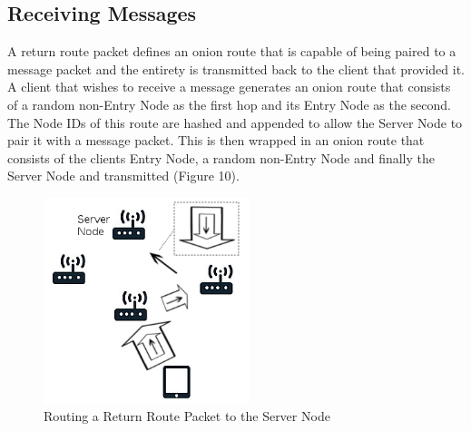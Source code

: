 \documentclass{article}
\begin{document}
\subsection{Receiving Messages}
A return route packet defines an onion route that is capable of being paired to a message packet and the entirety is transmitted back to the client that provided it.
A client that wishes to receive a message generates an onion route that consists of a random non-Entry Node as the first hop and its Entry Node as the second. The
Node IDs of this route are hashed and appended to allow the Server Node to pair it with a message packet. This is then wrapped in an onion route that consists of the clients Entry Node,
a random non-Entry Node and finally the Server Node and transmitted (Figure 10).
\begin{figure}[h]
	\centering
  	\includegraphics[width=6cm,height=6cm,keepaspectratio]{img/ReturnRoutePacket.png}
	\caption{Routing a Return Route Packet to the Server Node}
\end{figure}
\end{document}
